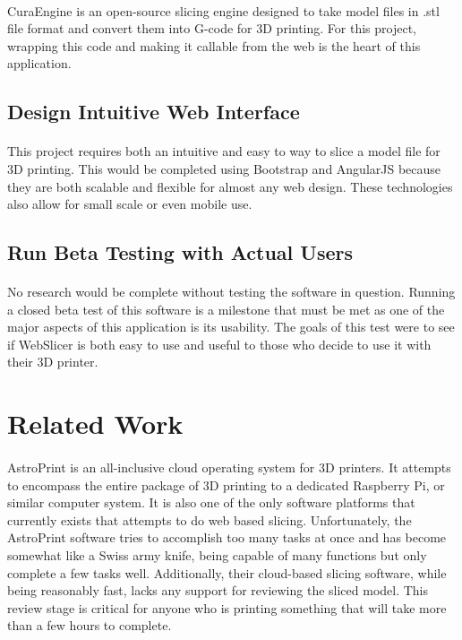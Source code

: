 \paragraph{}
CuraEngine is an open-source slicing engine designed to take model files in .stl file format and convert them into G-code for 3D printing.
For this project, wrapping this code and making it callable from the web is the heart of this application.

\subsection{Design Intuitive Web Interface}
\paragraph{}
This project requires both an intuitive and easy to way to slice a model file for 3D printing.
This would be completed using Bootstrap and AngularJS because they are both scalable and flexible for almost any web design.
These technologies also allow for small scale or even mobile use.

\subsection{Run Beta Testing with Actual Users}
\paragraph{}
No research would be complete without testing the software in question.
Running a closed beta test of this software is a milestone that must be met as one of the major aspects of this application is its usability.
The goals of this test were to see if WebSlicer is both easy to use and useful to those who decide to use it with their 3D printer.

\section{Related Work}
\paragraph{}
AstroPrint is an all-inclusive cloud operating system for 3D printers.
It attempts to encompass the entire package of 3D printing to a dedicated Raspberry Pi, or similar computer system.
It is also one of the only software platforms that currently exists that attempts to do web based slicing.
Unfortunately, the AstroPrint software tries to accomplish too many tasks at once and has become somewhat like a Swiss army knife, being capable of many functions but only complete a few tasks well.
Additionally, their cloud-based slicing software, while being reasonably fast, lacks any support for reviewing the sliced model.
This review stage is critical for anyone who is printing something that will take more than a few hours to complete.

